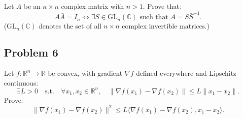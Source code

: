 \documentclass{article}
\begin{document}
Let $A$ be an $n \times n$ complex matrix with $n > 1$. Prove that:
\[
    A\bar{A} = I_n \iff \exists S \in \mathrm{GL}_n(\mathbb{C}) \text{ such that } A = S \bar{S}^{-1}.
\]
(\(\mathrm{GL}_n(\mathbb{C})\) denotes the set of all \(n \times n\) complex invertible matrices.)

\subsection*{Problem 6}

Let $f : \mathbb{R}^n \to \mathbb{R}$ be convex, with gradient $\nabla f$ defined everywhere and Lipschitz continuous:
\[
\exists L > 0 \quad \text{s.t.} \quad \forall x_1, x_2 \in \mathbb{R}^n,\quad \|\nabla f(x_1) - \nabla f(x_2)\| \le L \|x_1 - x_2\|.
\]
Prove:
\[
\|\nabla f(x_1) - \nabla f(x_2)\|^2 \le L \langle \nabla f(x_1) - \nabla f(x_2), x_1 - x_2 \rangle.
\]
\end{document}
